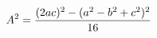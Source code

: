 \documentclass[preview]{standalone}
\begin{document}
\begin{align*}
\special{dvisvgm:raw <g id='unique000'>}A^2 = \frac{(2ac)^2 - (a^2-b^2+c^2)^2}{16}\special{dvisvgm:raw </g>}
\end{align*}
\end{document}

